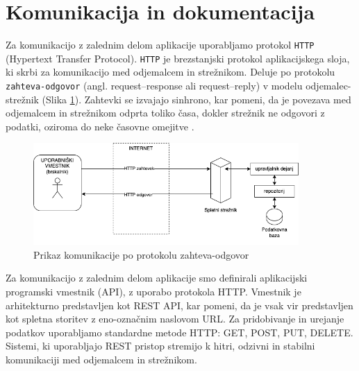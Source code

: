 \documentclass[a4paper, 12pt]{book}
\begin{document}
\section{Komunikacija in dokumentacija}
Za komunikacijo z zalednim delom aplikacije uporabljamo protokol \verb=HTTP= (Hypertext Transfer Protocol). \verb=HTTP= je brezstanjski protokol aplikacijskega sloja, ki skrbi za komunikacijo med odjemalcem in strežnikom. Deluje po protokolu \verb=zahteva-odgovor= (angl. request–response ali request–reply) v modelu odjemalec-strežnik (Slika \ref{communication-flow}). Zahtevki se izvajajo sinhrono, kar pomeni, da je povezava med odjemalcem in strežnikom odprta toliko časa, dokler strežnik ne odgovori z podatki, oziroma do neke časovne omejitve \cite{http-rfc}. 


\begin{figure}[h]
\begin{center}
\includegraphics[width=0.9\textwidth]{slike/communication.png}
\end{center}
\caption{ Prikaz komunikacije po protokolu zahteva-odgovor }
\label{communication-flow}
\end{figure}

Za komunikacijo z zalednim delom aplikacije smo definirali aplikacijski programski vmestnik (API), z uporabo protokola HTTP. Vmestnik je arhitekturno predstavljen kot REST API, kar pomeni, da je vsak vir predstavljen kot spletna storitev z eno-označnim naslovom URL. Za pridobivanje in urejanje podatkov uporabljamo standardne metode HTTP: GET, POST, PUT, DELETE. Sistemi, ki uporabljajo REST pristop stremijo k hitri, odzivni in stabilni komunikaciji med odjemalcem in strežnikom.
\end{document}
